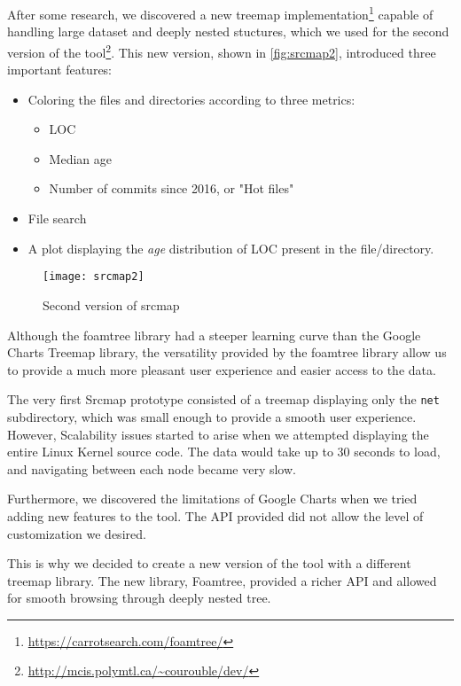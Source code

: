 After some research, we discovered a new treemap implementation\footnote{\url{https://carrotsearch.com/foamtree/}} capable of handling large dataset and deeply nested stuctures, which we used for the second version of the tool\footnote{\url{http://mcis.polymtl.ca/~courouble/dev/}}. This new version, shown in \autoref{fig:srcmap2}, introduced three important features: 
\begin{itemize}
	\item Coloring the files and directories according to three metrics:
	\begin{itemize}
		\item \ac{LOC}
		\item Median age
		\item Number of commits since 2016, or "Hot files"
	\end{itemize}
	\item File search
	\item A plot displaying the \textit{age} distribution of \ac{LOC} present in the file/directory.
\end{itemize}

\begin{figure}[htb]
\centering
\texttt{[image: srcmap2]}
\caption{Second version of srcmap}
\label{fig:srcmap2}
\end{figure}

Although the foamtree library had a steeper learning curve than the Google Charts Treemap library, the versatility provided by the foamtree library allow us to provide a much more pleasant user experience and easier access to the data.


The very first Srcmap prototype consisted of a treemap displaying only the \texttt{net} subdirectory, which was small enough to provide a smooth user experience. However, Scalability issues started to arise when we attempted displaying the entire Linux Kernel source code. The data would take up to 30 seconds to load, and navigating between each node became very slow.


Furthermore, we discovered the limitations of Google Charts when we tried adding new features to the tool. The API provided did not allow the level of customization we desired. 


This is why we decided to create a new version of the tool with a different treemap library. The new library, Foamtree, provided a richer API and allowed for smooth browsing through deeply nested tree.





